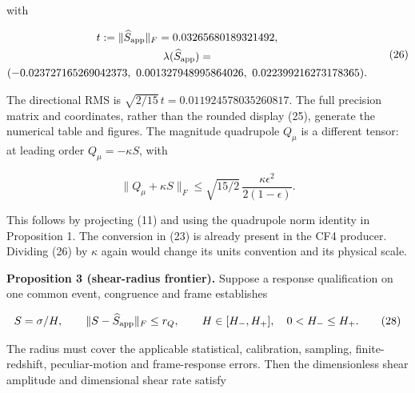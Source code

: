 \documentclass[aps,prd,reprint,onecolumn,11pt,nofootinbib,notitlepage]{revtex4-2}
\begin{document}
with

\begin{equation}
 \begin{gathered}t:=\|\widehat S_{\rm app}\|_F=0.03265680189321492,\\
 \lambda(\widehat S_{\rm app})=\\
 (-0.023727165269042373,\ 0.001327948995864026,\ 0.022399216273178365).\end{gathered}\tag{26}
\end{equation}

The directional RMS is \(\sqrt{2/15}\,t=0.011924578035260817\). The full precision matrix and coordinates, rather than the rounded display (25), generate the numerical table and figures. The magnitude quadrupole \(Q_\mu\) is a different tensor: at leading order \(Q_\mu=-\kappa S\), with

\begin{equation}
 \|Q_\mu+\kappa S\|_F\le\sqrt{15/2}\,
 \frac{\kappa\epsilon^2}{2(1-\epsilon)} .\tag{27}
\end{equation}

This follows by projecting (11) and using the quadrupole norm identity in Proposition 1. The conversion in (23) is already present in the CF4 producer. Dividing (26) by \(\kappa\) again would change its units convention and its physical scale.


\begin{table}[tb]
\caption{Retained apparent tensor in the dimensionless J2000 source basis (24). Singular values use the retained working metric. All central values are generated from full precision retained inputs.}

\end{table}
\begin{table}[tb]
\caption{Conditional frontier for assumed $r_Q$ and assumed $r_H/H_*=0.1$. Rate columns mean $\|\sigma\|_F/(\sqrt6 H_*)$. The zero-radius row is an exact-response limiting scenario, without a calibrated physical error estimate.}

\end{table}

\textbf{Proposition 3 (shear-radius frontier).} Suppose a response qualification on one common event, congruence and frame establishes

\begin{equation}
 S=\sigma/H,\qquad
 \|S-\widehat S_{\rm app}\|_F\le r_Q,\qquad
 H\in[H_-,H_+],\quad 0<H_-\le H_+ .\tag{28}
\end{equation}

The radius must cover the applicable statistical, calibration, sampling, finite-redshift, peculiar-motion and frame-response errors. Then the dimensionless shear amplitude and dimensional shear rate satisfy
\end{document}

